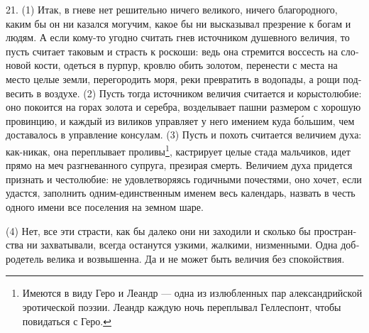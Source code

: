 21. (1) Итак, в гне­ве нет реши­тель­но ниче­го вели­ко­го, ниче­го бла­го­род­но­го, каким бы он ни казал­ся могу­чим, какое бы ни выска­зы­вал пре­зре­ние к богам и людям.
А если кому-то угод­но счи­тать гнев источ­ни­ком душев­но­го вели­чия, то пусть счи­та­ет тако­вым и страсть к рос­ко­ши: ведь она стре­мит­ся вос­сесть на сло­но­вой кости, одеть­ся в пур­пур, кров­лю обить золо­том, пере­не­сти с места на место целые зем­ли, пере­го­ро­дить моря, реки пре­вра­тить в водо­па­ды, а рощи под­ве­сить в возду­хе.
(2) Пусть тогда источ­ни­ком вели­чия счи­та­ет­ся и коры­сто­лю­бие: оно поко­ит­ся на горах золота и серебра, возде­лы­ва­ет паш­ни раз­ме­ром с хоро­шую про­вин­цию, и каж­дый из вили­ков управ­ля­ет у него име­ни­ем куда б\'{о}льшим, чем доста­ва­лось в управ­ле­ние кон­су­лам. (3) Пусть и похоть счи­та­ет­ся вели­чи­ем духа: как-никак, она пере­плы­ва­ет проливы\footnote{Име­ют­ся в виду Геро и Леандр --- одна из излюб­лен­ных пар алек­сан­дрий­ской эро­ти­че­ской поэ­зии. Леандр каж­дую ночь пере­плы­вал Гел­лес­понт, чтобы повидать­ся с Геро.}, каст­ри­ру­ет целые ста­да маль­чи­ков, идет пря­мо на меч раз­гне­ван­но­го супру­га, пре­зи­рая смерть. Вели­чи­ем духа при­дет­ся при­знать и често­лю­бие: не удо­вле­тво­ря­ясь годич­ны­ми поче­стя­ми, оно хочет, если удаст­ся, запол­нить одним-един­ст­вен­ным име­нем весь кален­дарь, назвать в честь одно­го име­ни все посе­ле­ния на зем­ном шаре.

(4) Нет, все эти стра­сти, как бы дале­ко они ни захо­ди­ли и сколь­ко бы про­стран­ства ни захва­ты­ва­ли, все­гда оста­нут­ся узки­ми, жал­ки­ми, низ­мен­ны­ми. Одна доб­ро­де­тель вели­ка и воз­вы­шен­на. Да и не может быть вели­чия без спо­кой­ст­вия.